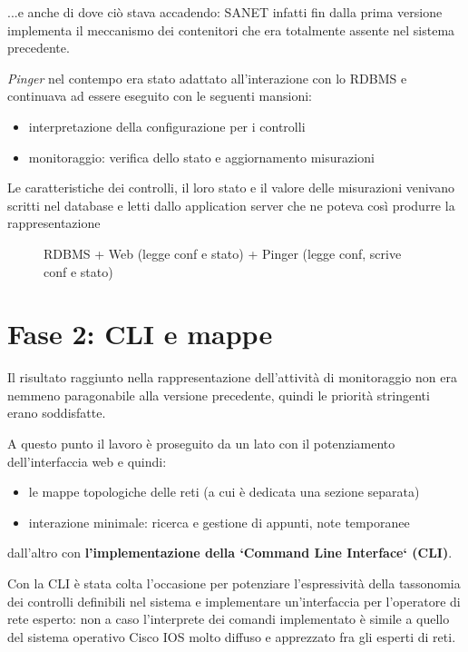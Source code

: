 \documentclass[a4wide,10pt,italian]{manual}
\begin{document}
...e anche di dove ciò stava accadendo: SANET infatti fin dalla prima versione
implementa il meccanismo dei contenitori che era totalmente assente nel sistema precedente.

\emph{Pinger} nel contempo era stato adattato all'interazione con lo RDBMS e continuava ad essere eseguito con le seguenti mansioni:
\begin{itemize}
\item {} 
interpretazione della configurazione per i controlli

\item {} 
monitoraggio: verifica dello stato e aggiornamento misurazioni

\end{itemize}

Le caratteristiche dei controlli, il loro stato e il valore delle misurazioni venivano scritti nel database
e letti dallo application server che ne poteva così produrre la rappresentazione
\hypertarget{dev-first-architecture}{}\begin{figure}[htbp]
\centering

\caption{RDBMS + Web (legge conf e stato) + Pinger (legge conf, scrive conf e stato)}\end{figure}


\section{Fase 2: CLI e mappe}

Il risultato raggiunto nella rappresentazione dell'attività di monitoraggio non era nemmeno paragonabile
alla versione precedente, quindi le priorità stringenti erano soddisfatte.

A questo punto il lavoro è proseguito da un lato con il potenziamento dell'interfaccia web e quindi:
\begin{itemize}
\item {} 
le mappe topologiche delle reti (a cui è dedicata una sezione separata)

\item {} 
interazione minimale: ricerca e gestione di appunti, note temporanee

\end{itemize}

dall'altro con \textbf{l'implementazione della {}`Command Line Interface{}` (CLI)}.

Con la CLI è stata colta l'occasione per potenziare l'espressività della tassonomia dei controlli
definibili nel sistema e implementare un'interfaccia per l'operatore di rete esperto: non a caso
l'interprete dei comandi implementato è simile a quello del sistema operativo Cisco IOS
molto diffuso e apprezzato fra gli esperti di reti.
\end{document}
